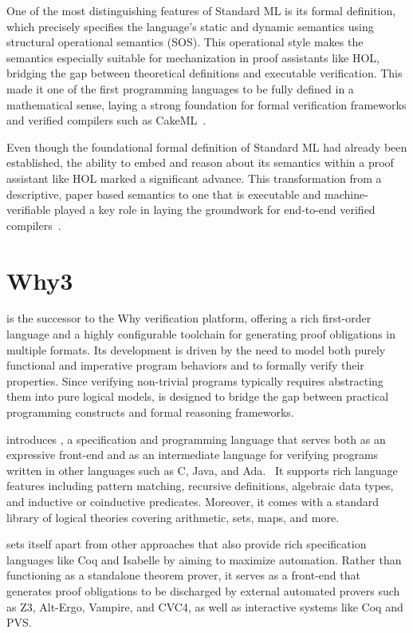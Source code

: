 One of the most distinguishing features of Standard ML is its formal definition, which precisely specifies the language's 
static and dynamic semantics using structural operational semantics (SOS). This operational style makes the semantics 
especially suitable for mechanization in proof assistants like HOL, bridging the gap between theoretical definitions 
and executable verification. This made it one of the first programming languages to be fully defined in a mathematical 
sense, laying a strong foundation for formal verification frameworks and verified compilers such as 
CakeML~\cite{milner1997definition, SewellMTKMAO23}. 

Even though the foundational formal definition of Standard ML had already been established, the ability to embed and 
reason about its semantics within a proof assistant like HOL marked a significant advance. This transformation from a 
descriptive, paper based semantics to one that is executable and machine-verifiable played a key role in laying the 
groundwork for end-to-end verified compilers~\cite{Syme93}.

\section{Why3}
\label{sec:Why3}

\whythree is the successor to the Why verification platform, offering a rich first-order language and a highly configurable 
toolchain for generating proof obligations in multiple formats. Its development is driven by the need to model both purely 
functional and imperative program behaviors and to formally verify their properties. Since verifying non-trivial programs 
typically requires abstracting them into pure logical models, \whythree is designed to bridge the gap between practical programming 
constructs and formal reasoning frameworks.

\whythree introduces \whyml, a specification and programming language that serves both as an expressive front-end and as 
an intermediate language for verifying programs written in other languages such as C, Java, and Ada.~\cite{FilliatreP13} 
It supports rich language features including pattern matching, recursive definitions, algebraic data types, and inductive or 
coinductive predicates. Moreover, it comes with a standard library of logical theories covering arithmetic, sets, maps, 
and more.

\whythree sets itself apart from other approaches that also provide rich specification languages like \textsf{Coq} and 
\textsf{Isabelle} by aiming to maximize automation. Rather than functioning as a standalone theorem prover, it serves 
as a front-end that generates proof obligations to be discharged by external automated provers such as Z3, Alt-Ergo, 
Vampire, and CVC4, as well as interactive systems like Coq and PVS.

